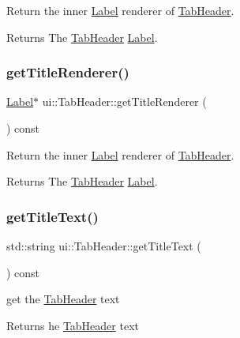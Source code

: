 Return the inner \hyperlink{classLabel}{Label} renderer of \hyperlink{classui_1_1TabHeader}{Tab\+Header}. \begin{DoxyReturn}{Returns}
The \hyperlink{classui_1_1TabHeader}{Tab\+Header} \hyperlink{classLabel}{Label}. 
\end{DoxyReturn}
\mbox{\label{classui_1_1TabHeader_af967e7a49ebaf9f22bb4e14992fba2a5}} 
\subsubsection{\texorpdfstring{get\+Title\+Renderer()}{getTitleRenderer()}\hspace{0.1cm}{\footnotesize\ttfamily [2/2]}}
{\footnotesize\ttfamily \hyperlink{classLabel}{Label}$\ast$ ui\+::\+Tab\+Header\+::get\+Title\+Renderer (\begin{DoxyParamCaption}{ }\end{DoxyParamCaption}) const}

Return the inner \hyperlink{classLabel}{Label} renderer of \hyperlink{classui_1_1TabHeader}{Tab\+Header}. \begin{DoxyReturn}{Returns}
The \hyperlink{classui_1_1TabHeader}{Tab\+Header} \hyperlink{classLabel}{Label}. 
\end{DoxyReturn}
\mbox{\label{classui_1_1TabHeader_a512e82508a5ae505be8c4b01645212e1}} 
\subsubsection{\texorpdfstring{get\+Title\+Text()}{getTitleText()}\hspace{0.1cm}{\footnotesize\ttfamily [1/2]}}
{\footnotesize\ttfamily std\+::string ui\+::\+Tab\+Header\+::get\+Title\+Text (\begin{DoxyParamCaption}{ }\end{DoxyParamCaption}) const}

get the \hyperlink{classui_1_1TabHeader}{Tab\+Header} text \begin{DoxyReturn}{Returns}
he \hyperlink{classui_1_1TabHeader}{Tab\+Header} text 
\end{DoxyReturn}
\mbox{\label{classui_1_1TabHeader_a512e82508a5ae505be8c4b01645212e1}} 

